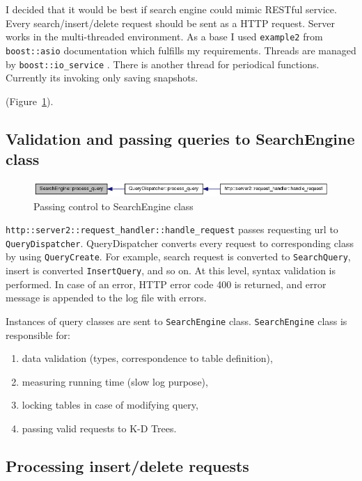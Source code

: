 \documentclass[10pt,a4paper]{article}
\begin{document}
I decided that it would be best if search engine could mimic RESTful service. Every search/insert/delete request should be sent as a HTTP request. Server works in the multi-threaded environment. As a base I used \verb|example2| \cite{ASIOHTTP} from \verb|boost::asio| documentation which fulfills my requirements. Threads are managed by \verb|boost::io_service| \cite{IOSERVICE}. There is another thread for periodical functions. Currently its invoking only saving snapshots.

 (Figure~\ref{fig:passing}).

\subsection{Validation and passing queries to SearchEngine class}

\begin{figure}
\centering
  \includegraphics[width=16cm]{passingtosearchengine}
  \caption{Passing control to SearchEngine class}
  \label{fig:passing}
\end{figure}

\verb|http::server2::request_handler::handle_request| passes requesting url to \verb|QueryDispatcher|. QueryDispatcher converts every request to corresponding class by using \verb|QueryCreate|. For example, search request is converted to \verb|SearchQuery|, insert is converted \verb|InsertQuery|, and so on. At this level, syntax validation is performed. In case of an error, HTTP error code 400 is returned, and error message is appended to the log file with errors. 

Instances of query classes are sent to \verb|SearchEngine| class. \verb|SearchEngine| class is responsible for:
\begin{enumerate}
\item data validation (types, correspondence to table definition),
\item measuring running time (slow log purpose),
\item locking tables in case of modifying query,
\item passing valid requests to K-D Trees.
\end{enumerate}

\subsection{Processing insert/delete requests}
\end{document}
